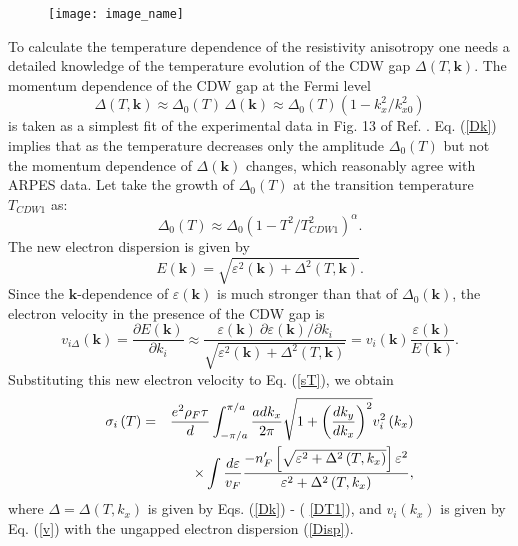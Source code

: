 \begin{figure}[h]
\texttt{[image: image\_name]}
\label{fig:label}
\end{figure}


To calculate the temperature dependence of the resistivity
anisotropy one needs a detailed knowledge of the temperature
evolution of the CDW gap $\Delta \left( T,\boldsymbol{k}\right)$.
The momentum dependence of the CDW gap at the Fermi level
\begin{equation}
\Delta \left( T,\boldsymbol{k}\right) \approx \Delta _{0}\left(
T\right) \,\Delta \left( \boldsymbol{k}\right) \approx \Delta
_{0}\left( T\right) \left( 1-k_{x}^{2}/k_{x0}^{2}\right)  \label{Dk}
\end{equation}
is taken as a simplest fit of the experimental data in Fig. 13 of
Ref. \cite{Brouet08}. Eq. (\ref{Dk}) implies that as the temperature
decreases only the amplitude $\Delta _{0}\left( T\right) $ but not
the momentum dependence of $\Delta \left( \boldsymbol{k}\right) $
changes, which reasonably agree with ARPES data. Let take the growth
of $\Delta _{0}(T)$ at the transition temperature $T_{CDW1}$ as:
\begin{equation}
\Delta _{0}\left( T\right) \approx \Delta _{0}\left(
1-T^{2}/T_{CDW1}^{2}\right)^{\alpha}.
\label{DT1}
\end{equation}
The new electron dispersion is given by \cite{CommentED}
\begin{equation}
E\left( \boldsymbol{k}\right) =\sqrt{\varepsilon ^{2}\left( \boldsymbol{k}
\right) +\Delta ^{2}\left( T,\boldsymbol{k}\right) }.  \label{Ed}
\end{equation}
Since the $\boldsymbol{k}$-dependence of $\varepsilon \left( \boldsymbol{k}
\right) $ is much stronger than that of $\Delta _{0}\left( \boldsymbol{k}
\right) $, the electron velocity in the presence of the CDW gap is
\begin{equation}
v_{i\Delta }\left( \boldsymbol{k}\right) =\frac{\partial E\left( \boldsymbol{
k}\right) }{\partial k_{i}}\approx \frac{\varepsilon \left( \boldsymbol{k}
\right) ~\partial \varepsilon \left( \boldsymbol{k}\right) /\partial k_{i}}{
\sqrt{\varepsilon ^{2}\left( \boldsymbol{k}\right) +\Delta ^{2}\left( T,
\boldsymbol{k}\right) }}=v_{i}\left( \boldsymbol{k}\right)
\frac{\varepsilon \left( \boldsymbol{k}\right) }{E\left(
\boldsymbol{k}\right) }.  \label{vD}
\end{equation}
Substituting this new electron velocity to Eq. (\ref{sT}), we obtain
\begin{eqnarray}
\sigma _{i}\left( T\right)  &=&\frac{e^{2}\rho _{F}\tau
}{d}\int_{-\pi /a}^{\pi /a}\frac{adk_{x}}{2\pi }\sqrt{1+\left(
\frac{dk_{y}}{dk_{x}}\right)
^{2}}v_{i}^{2}\left( k_{x}\right)   \notag \\
&&\times \int \frac{d\varepsilon }{v_{F}}\frac{-n_{F}^{\prime }\left[ \sqrt{
\varepsilon ^{2}+\Delta ^{2}\left( T,k_{x}\right) }\right] \varepsilon ^{2}}{
\varepsilon ^{2}+\Delta ^{2}\left( T,k_{x}\right) },  \label{sT1}
\end{eqnarray}
where $\Delta =\Delta \left( T,k_{x}\right) $ is given by Eqs. (\ref{Dk}) - (
\ref{DT1}), and $v_{i}\left( k_{x}\right) $ is given by Eq.
(\ref{v}) with the ungapped electron dispersion (\ref{Disp}).

